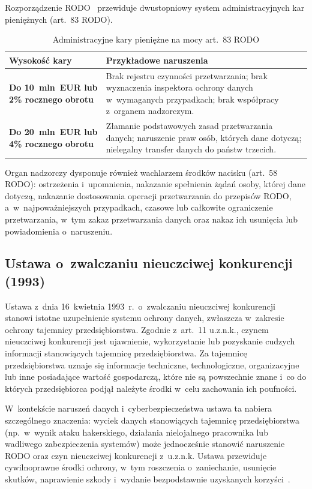 Rozporządzenie RODO~\autocite{rodo} przewiduje dwustopniowy system administracyjnych kar
pieniężnych (art.~83 RODO).

\begin{table}[H]
\centering
\caption{Administracyjne kary pieniężne na mocy art.~83 RODO}
\label{tab:rodo_kary}
\begin{tabular}{>{\bfseries}p{4.5cm} p{9cm}}
\hline
Wysokość kary & Przykładowe naruszenia \\
\hline
Do 10~mln~EUR lub 2\% rocznego obrotu
  & Brak rejestru czynności przetwarzania; brak wyznaczenia inspektora ochrony
    danych w~wymaganych przypadkach; brak współpracy z~organem nadzorczym. \\[4pt]
Do 20~mln~EUR lub 4\% rocznego obrotu
  & Złamanie podstawowych zasad przetwarzania danych; naruszenie praw osób,
    których dane dotyczą; nielegalny transfer danych do państw trzecich. \\
\hline
\end{tabular}
\end{table}

Organ nadzorczy dysponuje również wachlarzem środków nacisku (art.~58 RODO): ostrzeżenia i~upomnienia, nakazanie spełnienia żądań osoby,
której dane dotyczą, nakazanie dostosowania operacji przetwarzania do przepisów RODO, a~w~najpoważniejszych przypadkach, czasowe lub całkowite ograniczenie
przetwarzania, w~tym zakaz przetwarzania danych oraz nakaz ich usunięcia lub powiadomienia o~naruszeniu.

\subsection{Ustawa o~zwalczaniu nieuczciwej konkurencji (1993)}

Ustawa z~dnia 16~kwietnia 1993~r.\ o~zwalczaniu nieuczciwej konkurencji~\autocite{uznk1993} stanowi istotne uzupełnienie systemu ochrony danych, zwłaszcza w~zakresie ochrony tajemnicy przedsiębiorstwa. Zgodnie z~art.~11 u.z.n.k., czynem nieuczciwej konkurencji jest ujawnienie, wykorzystanie lub pozyskanie cudzych informacji stanowiących tajemnicę przedsiębiorstwa. Za tajemnicę przedsiębiorstwa uznaje się informacje techniczne,
technologiczne, organizacyjne lub inne posiadające wartość gospodarczą, które nie są powszechnie znane i~co do których przedsiębiorca podjął należyte środki
w~celu zachowania ich poufności.

W~kontekście naruszeń danych i~cyberbezpieczeństwa ustawa ta nabiera szczególnego znaczenia: wyciek danych stanowiących tajemnicę przedsiębiorstwa (np.\ w~wynik ataku hakerskiego, działania nielojalnego pracownika lub wadliwego zabezpieczenia systemów) może jednocześnie stanowić naruszenie RODO oraz czyn nieuczciwej konkurencji z~u.z.n.k. Ustawa przewiduje cywilnoprawne środki ochrony, w~tym roszczenia o~zaniechanie, usunięcie skutków, naprawienie szkody i~wydanie bezpodstawnie uzyskanych korzyści~\autocite{uznk1993}.


